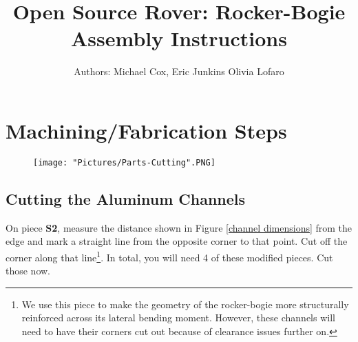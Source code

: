 \documentclass[12pt]{article}
\begin{document}
\title{Open Source Rover: Rocker-Bogie Assembly Instructions}
\author{Authors: Michael Cox, Eric Junkins Olivia Lofaro}

\makeatletter         
\def\@maketitle{
\begin{center}	
	\makebox[\textwidth][c]{ \texttt{[image: "Pictures/Rocker-Bogie/Rocker Bogie Title".png]}}
	{\Huge \bfseries \sffamily \@title }\\[3ex] 
	{\Large \sffamily \@author}\\[3ex] 
	\texttt{[image: "Pictures/Misc/JPL logo".png]}
\end{center}}
\makeatother

\maketitle



\newpage

\tableofcontents

\newpage
\section{Machining/Fabrication Steps}

\begin{figure}[H]
	\centering
	\texttt{[image: "Pictures/Parts-Cutting".PNG]}
\end{figure}

\subsection{Cutting the Aluminum Channels}
On piece \textbf{S2}, measure the distance shown in Figure \ref {channel dimensions} from the edge and mark a straight line from the opposite corner to that point. Cut off the corner along that line\footnote{We use this piece to make the geometry of the rocker-bogie more structurally reinforced across its lateral bending moment. However, these channels will need to have their corners cut out because of clearance issues further on.}. In total, you will need 4 of these modified pieces. Cut those now.
\end{document}

